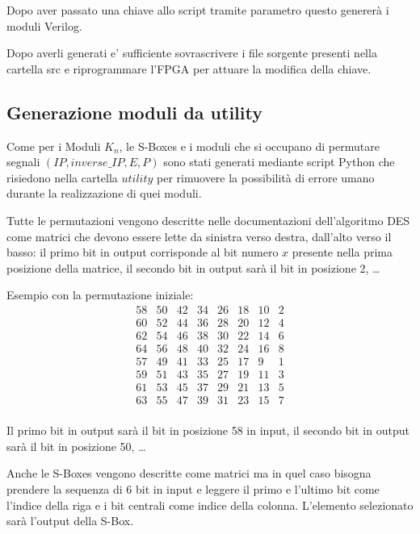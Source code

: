 \documentclass[a4paper]{article}
\begin{document}
Dopo aver passato una chiave allo script tramite parametro questo genererà i moduli Verilog.

Dopo averli generati e' sufficiente sovrascrivere i file sorgente presenti nella cartella src e riprogrammare l'FPGA per attuare la modifica della chiave.

\subsection{Generazione moduli da utility}
Come per i Moduli $K_n$, le S-Boxes e i moduli che si occupano di permutare segnali $(IP, inverse\_IP, E, P)$ sono stati generati mediante script Python che risiedono nella cartella $utility$ per rimuovere la possibilità di errore umano durante la realizzazione di quei moduli.

Tutte le permutazioni vengono descritte nelle documentazioni dell'algoritmo DES come matrici che devono essere lette da sinistra verso destra, dall'alto verso il basso: il primo bit in output corrisponde al bit numero $x$ presente nella prima posizione della matrice, il secondo bit in output sarà il bit in posizione 2, \dots

Esempio con la permutazione iniziale:
$$
\begin{matrix}
58 & 50 & 42 & 34 & 26 & 18 & 10 & 2 \\
60 & 52 & 44 & 36 & 28 & 20 & 12 & 4 \\
62 & 54 & 46 & 38 & 30 & 22 & 14 & 6 \\
64 & 56 & 48 & 40 & 32 & 24 & 16 & 8 \\
57 & 49 & 41 & 33 & 25 & 17 &  9 & 1 \\
59 & 51 & 43 & 35 & 27 & 19 & 11 & 3 \\
61 & 53 & 45 & 37 & 29 & 21 & 13 & 5 \\
63 & 55 & 47 & 39 & 31 & 23 & 15 & 7 \\
\end{matrix}
$$

Il primo bit in output sarà il bit in posizione 58 in input, il secondo bit in output sarà il bit in posizione 50, \dots
{}


Anche le S-Boxes vengono descritte come matrici ma in quel caso bisogna prendere la sequenza di 6 bit in input e leggere il primo e l'ultimo bit come l'indice della riga e i bit centrali come indice della colonna.
L'elemento selezionato sarà l'output della S-Box.
\end{document}
